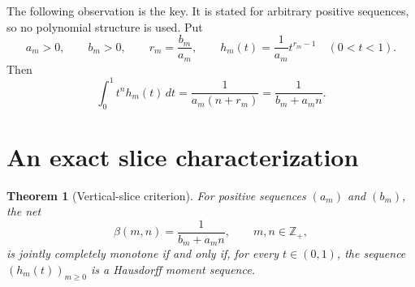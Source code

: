 \documentclass[11pt]{article}
\newtheorem{theorem}{Theorem}
\newcommand{\Nzero}{\mathbb Z_{+}}
\begin{document}
The following observation is the key.  It is stated for arbitrary positive
sequences, so no polynomial structure is used.  Put
\[
 a_m>0,\qquad b_m>0,\qquad r_m=\frac{b_m}{a_m},
 \qquad
 h_m(t)=\frac1{a_m}t^{r_m-1}\quad(0<t<1).
\]
Then
\begin{equation}\label{eq:vertical-integral}
 \int_0^1t^nh_m(t)\,dt
 =\frac1{a_m(n+r_m)}
 =\frac1{b_m+a_mn}.
\end{equation}

\section{An exact slice characterization}

\begin{theorem}[Vertical-slice criterion]\label{thm:slice}
For positive sequences $(a_m)$ and $(b_m)$, the net
\[
 \beta(m,n)=\frac1{b_m+a_mn},\qquad m,n\in\Nzero,
\]
is jointly completely monotone if and only if, for every $t\in(0,1)$, the
sequence $(h_m(t))_{m\ge0}$ is a Hausdorff moment sequence.
\end{theorem}
\end{document}
